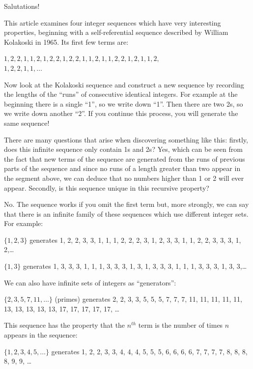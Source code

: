 \documentclass[11pt,a4paper]{report}
\begin{document}
	\begin{multicols}{2}
		
		Salutations!
		
		This article examines four integer sequences which have very interesting properties, beginning with a self-referential sequence described by William Kolakoski in 1965. Its first few terms are: \par
		\(1, 2, 2, 1, 1, 2, 1, 2, 2, 1, 2, 2, 1, 1, 2, 1, 1, 2, 2, 1, 2, 1, 1, 2,\)
		\\
		\(1, 2, 2, 1, 1,\ldots\) \par
		Now look at the Kolakoski sequence and construct a new sequence by recording the lengths of the “runs” of consecutive identical integers. For example at the beginning there is a single “1”, so we write down “1”. Then there are two 2s, so we write down another “2”. If you continue this process, you will generate the same sequence! \par
		There are many questions that arise when discovering something like this: firstly, does this infinite sequence only contain 1s and 2s? Yes, which can be seen from the fact that new terms of the sequence are generated from the runs of previous parts of the sequence and since no runs of a length greater than two appear in the segment above, we can deduce that no numbers higher than 1 or 2 will ever appear. Secondly, is this sequence unique in this recursive property? \par
		No. The sequence works if you omit the first term but, more strongly, we can say that there is an infinite family of these sequences which use different integer sets. For example:\par
		
		\(\{1, 2, 3\}\) generates 1, 2, 2, 3, 3, 1, 1, 1, 2, 2, 2, 3, 1, 2, 3, 3, 1, 1, 2, 2, 3, 3, 3, 1, 2,\ldots
		
		\(\{1, 3\}\) generates 1, 3, 3, 3, 1, 1, 1, 3, 3, 3, 1, 3, 1, 3, 3, 3, 1, 1, 1, 3, 3, 3, 1, 3, 3,\ldots
		
		We can also have infinite sets of integers as “generators”: \par
		
		\(\{2, 3, 5, 7, 11,\ldots\}\) (primes) generates 2, 2, 3, 3, 5, 5, 5, 7, 7, 7, 11, 11, 11, 11, 11, 13, 13, 13, 13, 13, 17, 17, 17, 17, 17, \ldots
		
		This sequence has the property that the \(n^{th}\) term is the number of times \(n\) appears in the sequence: \par
		\(\{1, 2, 3, 4, 5,\ldots\}\) generates 1, 2, 2, 3, 3, 4, 4, 4, 5, 5, 5, 6, 6, 6, 6, 7, 7, 7, 7, 8, 8, 8, 8, 9, 9, \ldots
		

\end{multicols}
\end{document}

